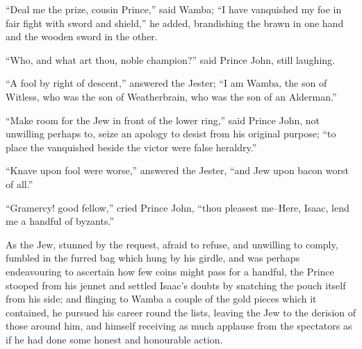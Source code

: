 ``Deal me the prize, cousin Prince,'' said Wamba; ``I have vanquished my
foe in fair fight with sword and shield,'' he added, brandishing the
brawn in one hand and the wooden sword in the other.

``Who, and what art thou, noble champion?'' said Prince John, still
laughing.

``A fool by right of descent,'' answered the Jester; ``I am Wamba, the
son of Witless, who was the son of Weatherbrain, who was the son of an
Alderman.''

``Make room for the Jew in front of the lower ring,'' said Prince John,
not unwilling perhaps to, seize an apology to desist from his original
purpose; ``to place the vanquished beside the victor were false
heraldry.''

``Knave upon fool were worse,'' answered the Jester, ``and Jew upon
bacon worst of all.''

``Gramercy! good fellow,'' cried Prince John, ``thou pleasest me--Here,
Isaac, lend me a handful of byzants.''

As the Jew, stunned by the request, afraid to refuse, and unwilling to
comply, fumbled in the furred bag which hung by his girdle, and was
perhaps endeavouring to ascertain how few coins might pass for a
handful, the Prince stooped from his jennet and settled Isaac's doubts
by snatching the pouch itself from his side; and flinging to Wamba a
couple of the gold pieces which it contained, he pursued his career
round the lists, leaving the Jew to the derision of those around him,
and himself receiving as much applause from the spectators as if he had
done some honest and honourable action.
